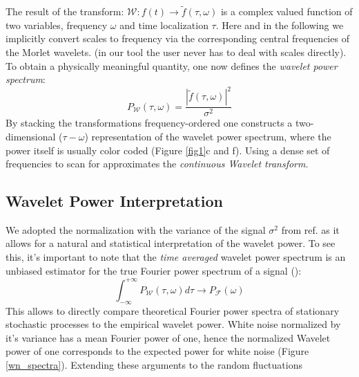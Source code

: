 The result of the transform: $\mathcal{W}: f(t) \rightarrow \widetilde{f}(\tau,\omega)$ is a complex valued function of two variables, frequency $\omega$ and time localization $\tau$. Here and in the following we implicitly convert scales to frequency via the corresponding central frequencies of the Morlet wavelets. (in our tool the user never has to deal with scales directly). To obtain a physically meaningful quantity, one now defines the \textit{wavelet power spectrum}:
\begin{equation}
P_\mathcal{W}(\tau, \omega) = \frac{|\widetilde{f}(\tau, \omega)|^2}{\sigma^2}
\end{equation}
By stacking the transformations frequency-ordered one constructs a two-dimensional ($\tau-\omega$) representation of the wavelet power spectrum, where the power itself is usually color coded (Figure \ref{fig1}c and f). Using a dense set of frequencies to scan for approximates the \textit{continuous Wavelet transform}.


\subsection*{Wavelet Power Interpretation}

We adopted the normalization with the variance of the signal $\sigma^2$ from ref. \cite{Torrence1998} as it allows for a natural and statistical interpretation of the wavelet power. To see this, it's important to note that the \textit{time averaged} wavelet power spectrum is an unbiased estimator for the true Fourier power spectrum of a signal (\cite{Percival1995}):
\begin{equation}
\int_{-\infty}^{+\infty} P_\mathcal{W}(\tau, \omega) d\tau \rightarrow P_\mathcal{F}(\omega)
\end{equation}
This allows to directly compare theoretical Fourier power spectra of stationary stochastic processes to the empirical wavelet power. White noise normalized by it's variance has a mean Fourier power of one, hence the normalized Wavelet power of one corresponds to the expected power for white noise (Figure \ref{wn_spectra}). Extending these arguments to the random fluctuations 
